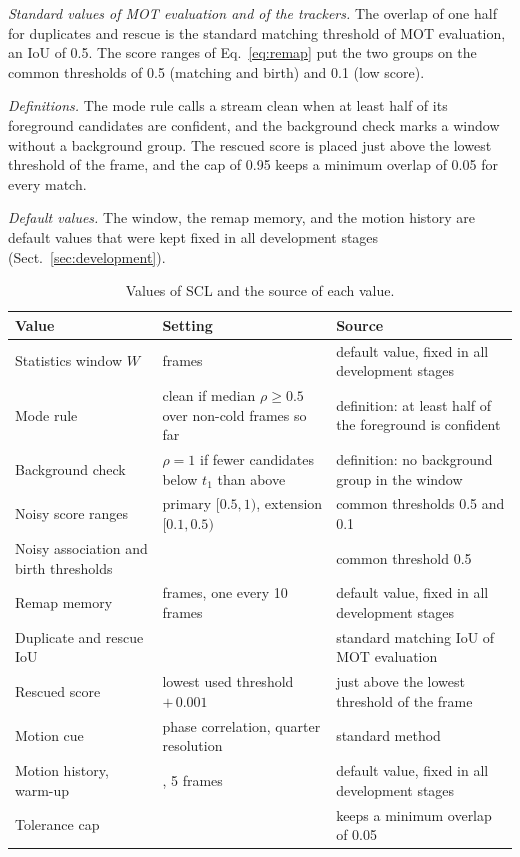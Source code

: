 \documentclass[pdflatex,sn-mathphys-num,iicol]{sn-jnl}
\newcommand{\scl}{SCL}
\begin{document}
\emph{Standard values of MOT evaluation and of the trackers.} The overlap of one half for
duplicates and rescue is the standard matching threshold of MOT evaluation, an IoU of 0.5. The score
ranges of Eq.~\eqref{eq:remap} put the two groups on the common thresholds of 0.5 (matching and
birth) and 0.1 (low score).

\emph{Definitions.} The mode rule calls a stream clean when at least half of its foreground
candidates are confident, and the background check marks a window without a background group. The
rescued score is placed just above the lowest threshold of the frame, and the cap of 0.95 keeps a
minimum overlap of 0.05 for every match.

\emph{Default values.} The window, the remap memory, and the motion history are default values
that were kept fixed in all development stages (Sect.~\ref{sec:development}).

\begin{table}[t]
\caption{Values of \scl{} and the source of each value.}
\label{tab:constants}
\centering\footnotesize
\setlength{\tabcolsep}{4pt}
\begin{tabular}{@{}>{\raggedright\arraybackslash}p{40mm}>{\raggedright\arraybackslash}p{52mm}>{\raggedright\arraybackslash}p{58mm}@{}}
\toprule
Value & Setting & Source\\
\midrule
Statistics window $W$ & 10 frames & default value, fixed in all development stages\\
Mode rule & clean if median $\rho\ge0.5$ over non-cold frames so far & definition: at least half of the foreground is confident\\
Background check & $\rho=1$ if fewer candidates below $t_1$ than above & definition: no background group in the window\\
Noisy score ranges & primary $[0.5,1)$, extension $[0.1,0.5)$ & common thresholds 0.5 and 0.1\\
Noisy association and birth thresholds & 0.5 & common threshold 0.5\\
Remap memory & 20 frames, one every 10 frames & default value, fixed in all development stages\\
Duplicate and rescue IoU & 0.5 & standard matching IoU of MOT evaluation\\
Rescued score & lowest used threshold $+\,0.001$ & just above the lowest threshold of the frame\\
Motion cue & phase correlation, quarter resolution & standard method \cite{reddy1996phasecorr}\\
Motion history, warm-up & 100, 5 frames & default value, fixed in all development stages\\
Tolerance cap & 0.95 & keeps a minimum overlap of 0.05\\
\bottomrule
\end{tabular}
\end{table}
\end{document}
